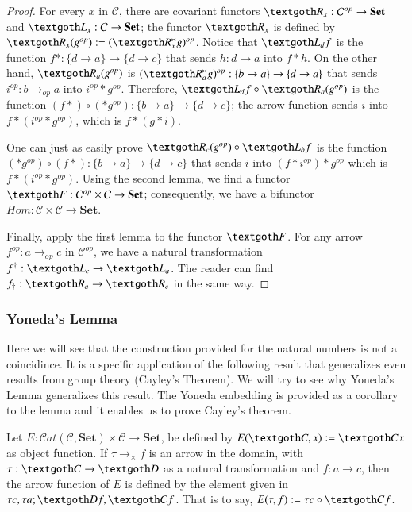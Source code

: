 \documentclass [12pt]{book}
\begin{document}
\begin{proof}For every $x$ in $\mathcal C$, there are covariant functors $\textgoth R_x:\mathcal C^{op}\rightarrow\textbf{Set}$ and $\textgoth L_x:\mathcal C\rightarrow\textbf{Set}$; the functor $\textgoth R_x$ is defined by $\textgoth R_x(g^{op}):=(\textgoth R_x^\ltimes g)^{op}$. Notice that $\textgoth L_df$ is the function $f*:\{d\rightarrow a\}\rightarrow\{d\rightarrow c\}$ that sends $h:d\rightarrow a$ into $f*h$. On the other hand, $\textgoth R_a(g^{op})$ is $(\textgoth R^\ltimes_ag)^{op}:\{b\rightarrow a\}\rightarrow\{d\rightarrow a\}$ that sends $i^{op}:b\rightarrow_{op}a$ into $i^{op}*g^{op}$. Therefore, $\textgoth L_df\circ\textgoth R_a(g^{op})$ is the function $(f*)\circ(*g^{op}):\{b\rightarrow a\}\rightarrow\{d\rightarrow c\}$; the arrow function sends $i$ into $f*(i^{op}*g^{op})$, which is $f*(g*i)$.

One can just as easily prove $\textgoth R_c(g^{op})\circ\textgoth L_bf$ is the function $(*g^{op})\circ(f*):\{b\rightarrow a\}\rightarrow\{d\rightarrow c\}$ that sends $i$ into $(f*i^{op})*g^{op}$ which is $f*(i^{op}*g^{op})$. Using the second lemma, we find a functor $\textgoth F:\mathcal C^{op}\times\mathcal C\rightarrow\textbf{Set}$; consequently, we have a bifunctor $Hom:\mathcal C\times\mathcal C\rightarrow\textbf{Set}$.

Finally, apply the first lemma to the functor $\textgoth F$. For any arrow $f^{op}:a\rightarrow_{op}c$ in $\mathcal C^{op}$, we have a natural transformation $f^\dagger:\textgoth L_c\rightarrow\textgoth L_a$. The reader can find $f_\dagger:\textgoth R_a\rightarrow\textgoth R_c$ in the same way.\end{proof}

\subsubsection{Yoneda's Lemma}Here we will see that the construction provided for the natural numbers is not a coincidince. It is a specific application of the following result that generalizes even results from group theory (Cayley's Theorem). We will try to see why Yoneda's Lemma generalizes this result. The Yoneda embedding is provided as a corollary to the lemma and it enables us to prove Cayley's theorem. 

Let $E:\mathcal Cat(\mathcal C,\textbf{Set})\times\mathcal C\rightarrow\textbf{Set}$, be defined by $E(\textgoth C,x):=\textgoth Cx$ as object function. If $\tau\rightarrow_\times f$ is an arrow in the domain, with $\tau:\textgoth C\rightarrow\textgoth D$ as a natural transformation and $f:a\rightarrow c$, then the arrow function of $E$ is defined by the element given in $\tau c,\tau a;\textgoth Df,\textgoth Cf$. That is to say, $E(\tau,f):=\tau c\circ\textgoth Cf$. 
\end{document}
